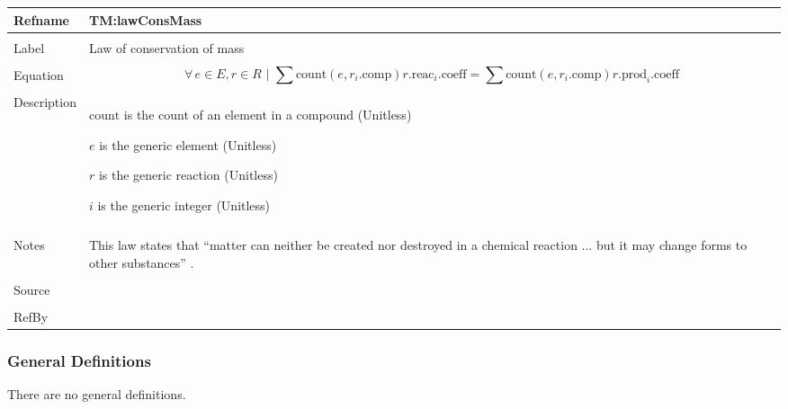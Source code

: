 \documentclass[12pt]{article}
\begin{document}
\begin{minipage}{\textwidth}
\begin{tabular}{>{\raggedright}p{}>{\raggedright\arraybackslash}p{}}
\toprule \textbf{Refname} & \textbf{TM:lawConsMass}
\label{TM:lawConsMass}
\\ \midrule \\
Label & Law of conservation of mass
        
\\ \midrule \\
Equation & \begin{displaymath}
           \forall{}\,e\in{}E,r\in{}R\text{ | }\displaystyle\sum{\text{count}\left(e,r_{i}\text{.comp}\right) {r\text{.reac}}_{i}\text{.coeff}}=\displaystyle\sum{\text{count}\left(e,r_{i}\text{.comp}\right) {r\text{.prod}}_{i}\text{.coeff}}
           \end{displaymath}
\\ \midrule \\
Description & \begin{symbDescription}
              \item{$\text{count}$ is the count of an element in a compound (Unitless)}
              \item{$e$ is the generic element (Unitless)}
              \item{$r$ is the generic reaction (Unitless)}
              \item{$i$ is the generic integer (Unitless)}
              \end{symbDescription}
\\ \midrule \\
Notes & This law states that ``matter can neither be created nor destroyed in a chemical reaction ... but it may change forms to other substances'' \cite[(pg. 112)]{lund2023}.
        
\\ \midrule \\
Source & \cite{lund2023}
         
\\ \midrule \\
RefBy & 
\\ \bottomrule
\end{tabular}
\end{minipage}
\subsubsection{General Definitions}
\label{Sec:GDs}
There are no general definitions.
\end{document}
